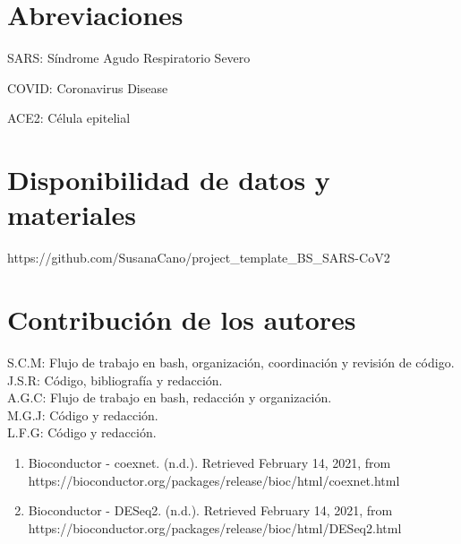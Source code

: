 \documentclass{bmcart}
\begin{document}
	\begin{backmatter}
	
		\section*{Abreviaciones}%
			SARS: Síndrome Agudo Respiratorio Severo
			
			COVID: Coronavirus Disease
			
			ACE2: Célula epitelial
		
		\section*{Disponibilidad de datos y materiales}%
			https://github.com/SusanaCano/project\_template\_BS\_SARS-CoV2
		
		\section*{Contribución de los autores}
			S.C.M: Flujo de trabajo en bash, organización, coordinación y revisión de código.\\
			J.S.R: Código, bibliografía y redacción.\\
			A.G.C: Flujo de trabajo en bash, redacción y organización.\\
			M.G.J: Código y redacción.\\
			L.F.G: Código y redacción.\\
		
		
		
		
		\begin{enumerate}
		
			\item Bioconductor - coexnet. (n.d.). Retrieved February 14, 2021, from https://bioconductor.org/packages/release/bioc/html/coexnet.html
			
			\item Bioconductor - DESeq2. (n.d.). Retrieved February 14, 2021, from https://bioconductor.org/packages/release/bioc/html/DESeq2.html
			

\end{enumerate}
\end{backmatter}
\end{document}
